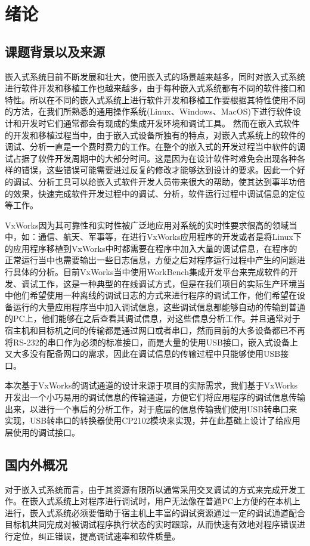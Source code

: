 \chapter{绪论}
\section{课题背景以及来源}
	嵌入式系统目前不断发展和壮大，使用嵌入式的场景越来越多，同时对嵌入式系统进行软件开发和移植工作也越来越多，由于每种嵌入式系统都有不同的软件接口和特性。所以在不同的嵌入式系统上进行软件开发和移植工作要根据其特性使用不同的方法，在我们所熟悉的通用操作系统(Linux、Windows、MacOS)下进行软件设计和开发时它们通常都会有现成的集成开发环境和调试工具。
	然而在嵌入式软件的开发和移植过程当中，由于嵌入式设备所独有的特点，对嵌入式系统上的软件的调试、分析一直是一个费时费力的工作。在整个的嵌入式的开发过程当中软件的调试占据了软件开发周期中的大部分时间。这是因为在设计软件时难免会出现各种各样的错误，这些错误可能需要进过反复的修改才能够达到设计的要求。因此一个好的调试、分析工具可以给嵌入式软件开发人员带来很大的帮助，使其达到事半功倍的效果，快速完成软件开发过程中的调试、分析，软件运行过程中调试信息的定位等工作。
	
	VxWorks因为其可靠性和实时性被广泛地应用对系统的实时性要求很高的领域当中，如：通信、航天、军事等\cite{刘小军2008基于}，在进行VxWorks应用程序的开发或者是将Linux下的应用程序移植到VxWorks中时都需要在程序中加入大量的调试信息，在程序的正常运行当中也需要输出一些日志信息，方便之后对程序运行过程中产生的问题进行具体的分析。目前VxWorks当中使用WorkBench集成开发平台来完成软件的开发、调试工作，这是一种典型的在线调试方式\cite{陈洋2007VxWorks}\cite{张鹏2007基于}，但是在我们项目的实际生产环境当中他们希望使用一种离线的调试日志的方式来进行程序的调试工作，他们希望在设备运行的大量应用程序当中加入调试信息，这些调试信息都能够自动的传输到普通的PC上，他们能够在之后查看其调试信息，对这些信息分析工作。并且通常对于宿主机和目标机之间的传输都是通过网口或者串口，然而目前的大多设备都已不再将RS-232的串口作为必须的标准接口，而是大量的使用USB接口，嵌入式设备上又大多没有配备网口的需求，因此在调试信息的传输过程中只能够使用USB接口。
	
	本次基于VxWorks的调试通道的设计来源于项目的实际需求，我们基于VxWorks开发出一个小巧易用的调试信息的传输通道，方便它们将应用程序的调试信息传输出来，以进行一个事后的分析工作，对于底层的信息传输我们使用USB转串口来实现，USB转串口的转换器使用CP2102模块来实现，并在此基础上设计了给应用层使用的调试接口。
	
			
\section{国内外概况}
	对于嵌入式系统而言，由于其资源有限所以通常采用交叉调试的方式来完成开发工作。在嵌入式系统上对程序进行调试时，用户无法像在普通PC上方便的在本机上进行，嵌入式系统必须要借助于宿主机上丰富的调试资源通过一定的调试通道配合目标机共同完成对被调试程序执行状态的实时跟踪，从而快速有效地对程序错误进行定位，纠正错误，提高调试速率和软件质量。
			
